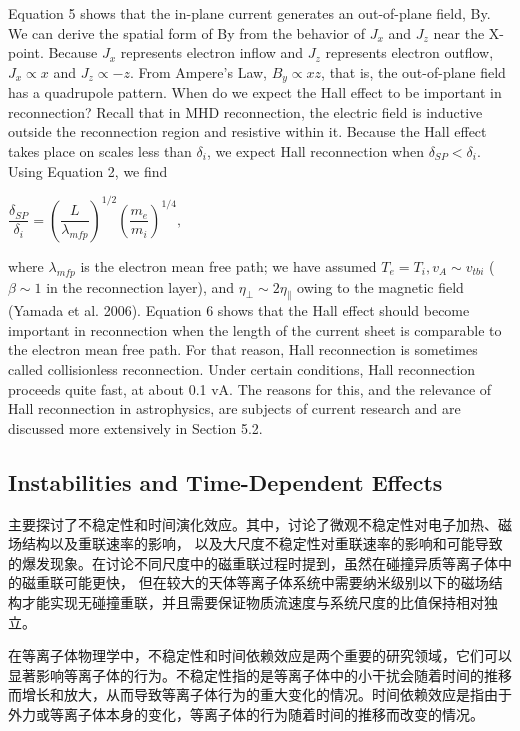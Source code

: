 \documentclass[12pt, a4paper, oneside]{article}
\begin{document}
\begin{spacing}{2.0}
Equation 5 shows that the in-plane current generates an out-of-plane field, By. We can derive the
spatial form of By from the behavior of $J_x$ and $J_z$ near the X-point. Because $J_x$ represents electron
inflow and $J_z$ represents electron outflow, $J_x \propto x$ and $J_z \propto -z$. From Ampere's Law, $B_y \propto xz$, that
is, the out-of-plane field has a quadrupole pattern.
When do we expect the Hall effect to be important in reconnection? Recall that in MHD
reconnection, the electric field is inductive outside the reconnection region and resistive within
it. Because the Hall effect takes place on scales less than $\delta_{i}$, we expect Hall reconnection when
$\delta_{SP} < \delta_{i}$. Using Equation 2, we find
\begin{center}
    $\dfrac{\delta_{SP}}{\delta_i}=\left(\dfrac{L}{\lambda_{mfp}}\right)^{1/2}\left(\dfrac{m_e}{m_i}\right)^{1/4},$
\end{center}

where $\lambda_{mfp}$ is the electron mean free path; we have assumed $T_e = T_i,v_A \sim v_{tbi}$ ($\beta \sim 1$ in the
reconnection layer), and $\eta_\perp \sim 2\eta_\parallel$ owing to the magnetic field (Yamada et al. 2006). Equation 6
shows that the Hall effect should become important in reconnection when the length of the
current sheet is comparable to the electron mean free path. For that reason, Hall reconnection is
sometimes called collisionless reconnection.
Under certain conditions, Hall reconnection proceeds quite fast, at about 0.1 vA. The reasons
for this, and the relevance of Hall reconnection in astrophysics, are subjects of current research
and are discussed more extensively in Section 5.2.


\subsection{Instabilities and Time-Dependent Effects}
主要探讨了不稳定性和时间演化效应。其中，讨论了微观不稳定性对电子加热、磁场结构以及重联速率的影响，
以及大尺度不稳定性对重联速率的影响和可能导致的爆发现象。在讨论不同尺度中的磁重联过程时提到，虽然在碰撞异质等离子体中的磁重联可能更快，
但在较大的天体等离子体系统中需要纳米级别以下的磁场结构才能实现无碰撞重联，并且需要保证物质流速度与系统尺度的比值保持相对独立。


在等离子体物理学中，不稳定性和时间依赖效应是两个重要的研究领域，它们可以显著影响等离子体的行为。不稳定性指的是等离子体中的小干扰会随着时间的推移而增长和放大，从而导致等离子体行为的重大变化的情况。时间依赖效应是指由于外力或等离子体本身的变化，等离子体的行为随着时间的推移而改变的情况。


\end{spacing}
\end{document}
